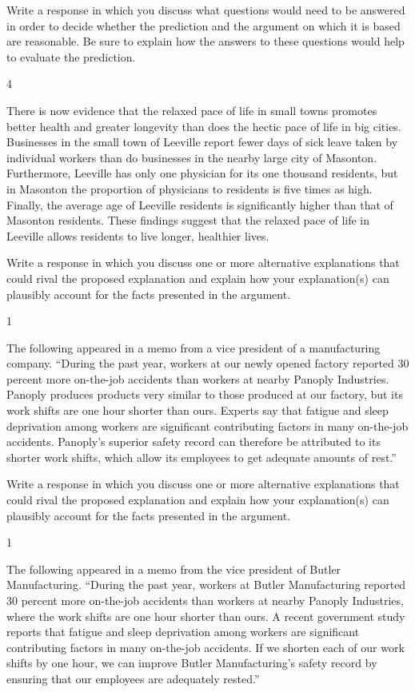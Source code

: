 \documentclass[]{article}
\begin{document}
Write a response in which you discuss what questions would need to be
answered in order to decide whether the prediction and the argument on
which it is based are reasonable. Be sure to explain how the answers to
these questions would help to evaluate the prediction.

4

There is now evidence that the relaxed pace of life in small towns
promotes better health and greater longevity than does the hectic pace
of life in big cities. Businesses in the small town of Leeville report
fewer days of sick leave taken by individual workers than do businesses
in the nearby large city of Masonton. Furthermore, Leeville has only one
physician for its one thousand residents, but in Masonton the proportion
of physicians to residents is five times as high. Finally, the average
age of Leeville residents is significantly higher than that of Masonton
residents. These findings suggest that the relaxed pace of life in
Leeville allows residents to live longer, healthier lives.

Write a response in which you discuss one or more alternative
explanations that could rival the proposed explanation and explain how
your explanation(s) can plausibly account for the facts presented in the
argument.

1

The following appeared in a memo from a vice president of a
manufacturing company. ``During the past year, workers at our newly
opened factory reported 30 percent more on-the-job accidents than
workers at nearby Panoply Industries. Panoply produces products very
similar to those produced at our factory, but its work shifts are one
hour shorter than ours. Experts say that fatigue and sleep deprivation
among workers are significant contributing factors in many on-the-job
accidents. Panoply's superior safety record can therefore be attributed
to its shorter work shifts, which allow its employees to get adequate
amounts of rest.''

Write a response in which you discuss one or more alternative
explanations that could rival the proposed explanation and explain how
your explanation(s) can plausibly account for the facts presented in the
argument.

1

The following appeared in a memo from the vice president of Butler
Manufacturing. ``During the past year, workers at Butler Manufacturing
reported 30 percent more on-the-job accidents than workers at nearby
Panoply Industries, where the work shifts are one hour shorter than
ours. A recent government study reports that fatigue and sleep
deprivation among workers are significant contributing factors in many
on-the-job accidents. If we shorten each of our work shifts by one hour,
we can improve Butler Manufacturing's safety record by ensuring that our
employees are adequately rested.''
\end{document}
